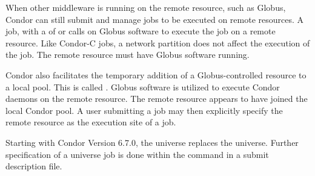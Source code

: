 When other middleware is running on the remote resource,
such as Globus,
Condor can still submit and manage jobs to be executed on
remote resources.
A   job,
with a  of
 or 
calls on Globus software to execute the job on a remote resource.
Like Condor-C jobs, a network partition does not affect
the execution of the job.
The remote resource must have Globus software running.

Condor also facilitates the temporary addition of a
Globus-controlled resource to a local pool.
This is called .
Globus software is utilized to execute Condor daemons on the
remote resource.
The remote resource appears to have joined the local Condor pool.
A user submitting a job may then explicitly specify the
remote resource as the execution site of a job.

Starting with Condor Version 6.7.0, the  universe
replaces the  universe.
Further specification of a  universe job is done
within the  command in a submit description file.
